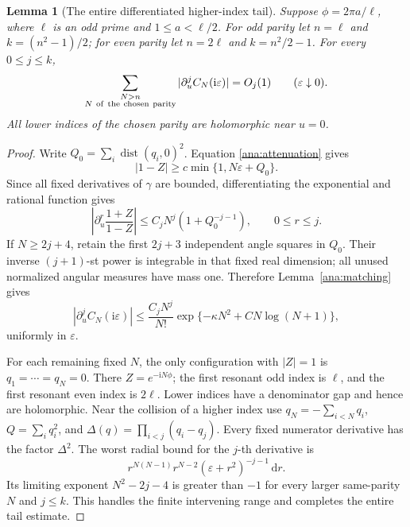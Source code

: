 \documentclass[11pt]{article}
\numberwithin{equation}{section}
\newtheorem{lemma}[theorem]{Lemma}
\theoremstyle{definition}
\newcommand{\ii}{\mathrm i}
\newcommand{\dd}{\,\mathrm d}
\newcommand{\eps}{\varepsilon}
\begin{document}
\begin{lemma}[The entire differentiated higher-index tail]
\label{ana:positivetail}
Suppose \(\phi=2\pi a/\ell\), where \(\ell\) is an odd prime and
\(1\le a<\ell/2\). For odd parity let \(n=\ell\) and
\(k=(n^2-1)/2\); for even parity let \(n=2\ell\) and
\(k=n^2/2-1\). For every \(0\le j\le k\),
\[
 \sum_{\substack{N>n\\N\ {\rm of\ the\ chosen\ parity}}}
 |\partial_u^j C_N(\ii\eps)|=O_j(1)
 \qquad(\eps\downarrow0).
\]
All lower indices of the chosen parity are holomorphic near \(u=0\).
\end{lemma}
\begin{proof}
Write \(Q_0=\sum_i\operatorname{dist}(q_i,0)^2\).
Equation \eqref{ana:attenuation} gives
\[
 |1-Z|\ge c\min\{1,N\eps+Q_0\}.
\]
Since all fixed derivatives of \(\gamma\) are bounded, differentiating
the exponential and rational function gives
\[
 \left|\partial_u^r\frac{1+Z}{1-Z}\right|
 \le C_j N^j(1+Q_0^{-j-1}),\qquad 0\le r\le j.
\]
If \(N\ge2j+4\), retain the first \(2j+3\) independent angle
squares in \(Q_0\). Their inverse \((j+1)\)-st power is integrable
in that fixed real dimension; all unused normalized angular measures
have mass one. Therefore Lemma~\ref{ana:matching} gives
\[
 |\partial_u^jC_N(\ii\eps)|
 \le\frac{C_jN^j}{N!}
       \exp\{-\kappa N^2+C N\log(N+1)\},
\]
uniformly in \(\eps\).

For each remaining fixed \(N\), the only configuration with
\(|Z|=1\) is \(q_1=\cdots=q_N=0\). There \(Z=e^{-\ii N\phi}\);
the first resonant odd index is \(\ell\), and the first resonant
even index is \(2\ell\). Lower indices have a denominator gap and
hence are holomorphic. Near the collision of a higher index use
\(q_N=-\sum_{i<N}q_i\), \(Q=\sum_iq_i^2\), and
\(\Delta(q)=\prod_{i<j}(q_i-q_j)\).
Every fixed numerator derivative has the factor \(\Delta^2\).
The worst radial bound for the \(j\)-th derivative is
\[
 r^{N(N-1)}r^{N-2}(\eps+r^2)^{-j-1}\dd r.
\]
Its limiting exponent \(N^2-2j-4\) is greater than \(-1\) for
every larger same-parity \(N\) and \(j\le k\). This handles the
finite intervening range and completes the entire tail estimate.
\end{proof}
\end{document}
